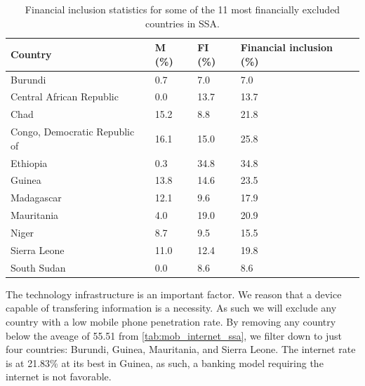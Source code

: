 \documentclass[11pt, a4paper]{article}
\begin{document}
\begin{table}[ht]
\centering
\begin{tabular}{|l|l|l|l|}
\hline
\textbf{Country}        & \textbf{M (\%)} & \textbf{FI (\%)} & \textbf{Financial inclusion (\%)} \\ \hline
Burundi             & 0.7            & 7.0                      & 7.0                  \\ \hline
Central African Republic    & 0.0            & 13.7                       & 13.7                  \\ \hline
Chad              & 15.2             & 8.8                      & 21.8                 \\ \hline
Congo, Democratic Republic of & 16.1             & 15.0                       & 25.8                  \\ \hline
Ethiopia            & 0.3            & 34.8                       & 34.8                  \\ \hline
Guinea            & 13.8             & 14.6                       & 23.5                  \\ \hline
Madagascar          & 12.1             & 9.6                      & 17.9                  \\ \hline
Mauritania          & 4.0            & 19.0                       & 20.9                  \\ \hline
Niger             & 8.7            & 9.5                      & 15.5                  \\ \hline
Sierra Leone          & 11.0             & 12.4                       & 19.8                  \\ \hline
South Sudan           & 0.0            & 8.6                      & 8.6                  \\ \hline
\end{tabular}
\caption{Financial inclusion statistics for some of the 11 most financially excluded countries in SSA\cite{gfindex}.}
\label{tab:financial_statistics_ssa}
\end{table}
The technology infrastructure is an important factor. We reason that a device capable of transfering information is a necessity. As such we will exclude any country with a low mobile phone penetration rate. By removing any country below the aveage of 55.51 from \autoref{tab:mob_internet_ssa}, we filter down to just four countries: Burundi, Guinea, Mauritania, and Sierra Leone. The internet rate is at 21.83\% at its best in Guinea, as such, a banking model requiring the internet is not favorable.
\end{document}

